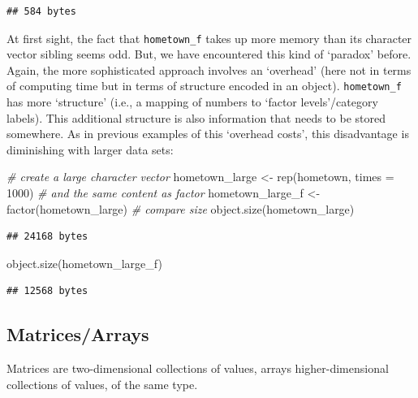 \documentclass[
  12pt,
]{style/krantz}
\newenvironment{Shaded}{\begin{snugshade}}{\end{snugshade}}
\newcommand{\AttributeTok}[1]{\textcolor[rgb]{0.77,0.63,0.00}{#1}}
\newcommand{\CommentTok}[1]{\textcolor[rgb]{0.56,0.35,0.01}{\textit{#1}}}
\newcommand{\DecValTok}[1]{\textcolor[rgb]{0.00,0.00,0.81}{#1}}
\newcommand{\FunctionTok}[1]{\textcolor[rgb]{0.00,0.00,0.00}{#1}}
\newcommand{\NormalTok}[1]{#1}
\newcommand{\OtherTok}[1]{\textcolor[rgb]{0.56,0.35,0.01}{#1}}
\begin{document}
\begin{verbatim}
## 584 bytes
\end{verbatim}

At first sight, the fact that \texttt{hometown\_f} takes up more memory than its character vector sibling seems odd. But, we have encountered this kind of `paradox' before. Again, the more sophisticated approach involves an `overhead' (here not in terms of computing time but in terms of structure encoded in an object). \texttt{hometown\_f} has more `structure' (i.e., a mapping of numbers to `factor levels'/category labels). This additional structure is also information that needs to be stored somewhere. As in previous examples of this `overhead costs', this disadvantage is diminishing with larger data sets:

\begin{Shaded}
\begin{Highlighting}[]
\CommentTok{\# create a large character vector}
\NormalTok{hometown\_large }\OtherTok{\textless{}{-}} \FunctionTok{rep}\NormalTok{(hometown, }\AttributeTok{times =} \DecValTok{1000}\NormalTok{)}
\CommentTok{\# and the same content as factor}
\NormalTok{hometown\_large\_f }\OtherTok{\textless{}{-}} \FunctionTok{factor}\NormalTok{(hometown\_large)}
\CommentTok{\# compare size}
\FunctionTok{object.size}\NormalTok{(hometown\_large)}
\end{Highlighting}
\end{Shaded}

\begin{verbatim}
## 24168 bytes
\end{verbatim}

\begin{Shaded}
\begin{Highlighting}[]
\FunctionTok{object.size}\NormalTok{(hometown\_large\_f)}
\end{Highlighting}
\end{Shaded}

\begin{verbatim}
## 12568 bytes
\end{verbatim}

\hypertarget{matricesarrays}{%
\subsection{Matrices/Arrays}\label{matricesarrays}}

Matrices are two-dimensional collections of values, arrays higher-dimensional collections of values, of the same type.
\end{document}
